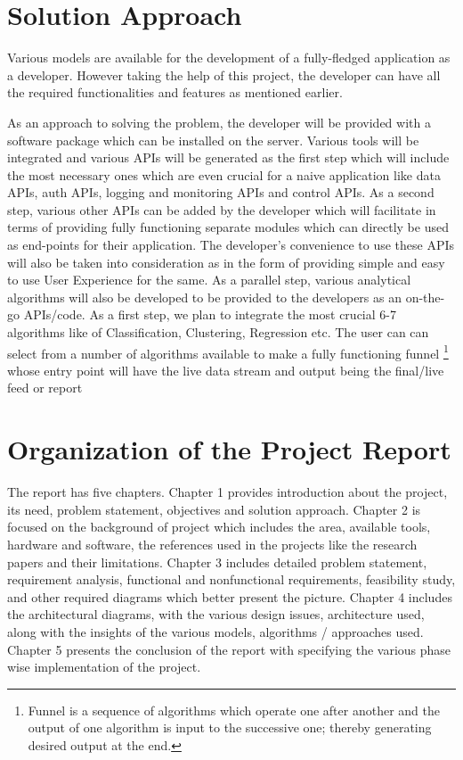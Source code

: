 \documentclass[a4paper,12pt]{report}
\begin{document}
    \section{Solution Approach}
Various models are available for the development of a fully-fledged application as a developer. However taking the help of this project, the developer can have all the required functionalities and features as mentioned earlier.

As an approach to solving the problem, the developer will be provided with a software package which can be installed on the server. Various tools will be integrated and various APIs will be generated as the first step which will include the most necessary ones which are even crucial for a naive application like data APIs, auth APIs, logging and monitoring APIs and control APIs.
As a second step, various other APIs can be added by the developer which will facilitate in terms of providing fully functioning separate modules which can directly be used as end-points for their application.
The developer’s convenience to use these APIs will also be taken into consideration as in the form of providing simple and easy to use User Experience for the same.
As a parallel step, various analytical algorithms will also be developed to be provided to the developers as an on-the-go APIs/code. As a first step, we plan to integrate the most crucial 6-7 algorithms like of Classification, Clustering, Regression etc.
The user can can select from a number of algorithms available to make a fully functioning funnel \footnote{Funnel is a sequence of algorithms which operate one after another and the output of one algorithm is input to the successive one; thereby generating desired output at the end.} whose entry point will have the live data stream and output being the final/live feed or report    
\section{Organization of the Project Report}    
The report has five chapters. Chapter 1 provides introduction about the project, its need, problem statement, objectives and solution approach. Chapter 2 is focused on the background of project which includes the area, available tools, hardware and software, the references used in the projects like the research papers and their limitations. Chapter 3 includes detailed problem statement, requirement analysis, functional and nonfunctional requirements, feasibility study, and other required diagrams which better present the picture. Chapter 4 includes the architectural diagrams, with the various design issues, architecture used, along with the insights of the various models, algorithms / approaches used. Chapter 5 presents the conclusion of the report with specifying the various phase wise implementation of the project.
\end{document}
